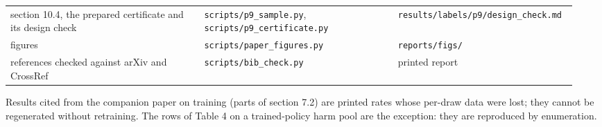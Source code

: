 \documentclass[11pt]{article}
\begin{document}
\begin{longtable}{@{}>{\raggedright\arraybackslash}p{0.334\linewidth}>{\raggedright\arraybackslash}p{0.333\linewidth}>{\raggedright\arraybackslash}p{0.279\linewidth}@{}}
\hspace{0pt}section 10.4, the prepared certificate and its design check & \hspace{0pt}\texttt{scripts/\allowbreak p9\_\allowbreak sample.py}, \texttt{scripts/\allowbreak p9\_\allowbreak certificate.py} & \hspace{0pt}\texttt{results/\allowbreak labels/\allowbreak p9/\allowbreak design\_\allowbreak check.md} \\
\hspace{0pt}figures & \hspace{0pt}\texttt{scripts/\allowbreak paper\_\allowbreak figures.py} & \hspace{0pt}\texttt{reports/\allowbreak figs/\allowbreak } \\
\hspace{0pt}references checked against arXiv and CrossRef & \hspace{0pt}\texttt{scripts/\allowbreak bib\_\allowbreak check.py} & \hspace{0pt}printed report \\
\end{longtable}
\endgroup

Results cited from the companion paper on training (parts of section 7.2) are printed rates whose per-draw data were lost; they cannot be regenerated without retraining. The rows of Table 4 on a trained-policy harm pool are the exception: they are reproduced by enumeration.
\end{document}
